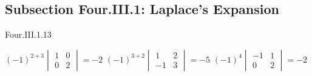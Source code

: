 \subsection{Subsection Four.III.1: Laplace's Expansion}
\begin{ans}{Four.III.1.13}
      \begin{exparts*}
       \partsitem \( (-1)^{2+3}\begin{vmatrix}
                            1  &0  \\
                            0  &2
                          \end{vmatrix}=-2  \)
       \partsitem \( (-1)^{3+2}\begin{vmatrix}
                            1  &2  \\
                           -1  &3
                          \end{vmatrix}=-5  \)
       \partsitem \( (-1)^{4}\begin{vmatrix}
                           -1  &1  \\
                            0  &2
                          \end{vmatrix}=-2  \)
      \end{exparts*}
    
\end{ans}
